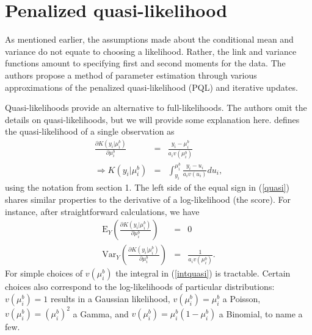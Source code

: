 \documentclass[12pt]{article}
\newcommand{\E}{\mathrm{E}}
\newcommand{\Var}{\mathrm{Var}}
\begin{document}
\section{Penalized quasi-likelihood}

\noindent As mentioned earlier, the assumptions made about the conditional mean and variance do not equate to choosing a likelihood. Rather, the link and variance functions amount to specifying first and second moments for the data. The authors propose a method of parameter estimation through various approximations of the penalized quasi-likelihood (PQL) and iterative updates.

Quasi-likelihoods provide an alternative to full-likelihoods. The authors omit the details on quasi-likelihoods, but we will provide some explanation here. \cite{wedderburn:1974} defines the quasi-likelihood of a single observation as
\begin{eqnarray}
\frac{\partial K(y_i| \mu_i^b)}{\partial \mu_i^b} &=& \frac{y_i-\mu_i^b}{a_i v(\mu_i^b)} \label{quasi} \\
\Longrightarrow K(y_i|\mu_i^b)&=&\int_{y_i}^{\mu_i^b}\frac{y_i-u_i}{a_i v(u_i)}du_i, \label{intquasi}
\end{eqnarray}
using the notation from section 1. The left side of the equal sign in (\ref{quasi}) shares similar properties to the derivative of a log-likelihood (the score). For instance, after straightforward calculations, we have
\begin{eqnarray}
\E_Y\left(\frac{\partial K(y_i| \mu_i^b)}{\partial \mu_i^b}\right) &=& 0 \\
\Var_Y\left(\frac{\partial K(y_i| \mu_i^b)}{\partial \mu_i^b}\right)&=& \frac{1}{a_i v(\mu_i^b)}.
\end{eqnarray}
For simple choices of $v(\mu_i^b)$ the integral in (\ref{intquasi}) is tractable. Certain choices also correspond to the log-likelihoods of particular distributions: $v(\mu_i^b)=1$ results in a Gaussian likelihood, $v(\mu_i^b)=\mu_i^b$ a Poisson, $v(\mu_i^b)=(\mu_i^b)^2$ a Gamma, and $v(\mu_i^b)=\mu_i^b(1-\mu_i^b)$ a Binomial, to name a few.
\end{document}
